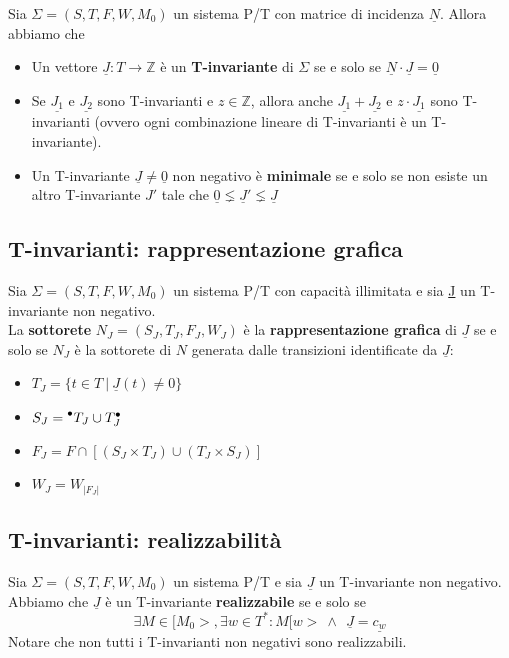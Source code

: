Sia $\Sigma = (S, T, F, W, M_0)$ un sistema P/T con matrice di incidenza $\underline N$. Allora abbiamo che
\begin{itemize}
	\item Un vettore $\underline J : T \to \mathbb Z$ è un \textbf{T-invariante} di $\Sigma$ se e solo se $\underline N \cdot \underline J = \underline 0$
	\item Se $\underline{J_1}$ e $\underline{J_2}$ sono T-invarianti e $z \in \mathbb Z$, allora anche $\underline{J_1} + \underline{J_2}$ e $z \cdot \underline {J_1}$ sono T-invarianti (ovvero ogni combinazione lineare di T-invarianti è un T-invariante).
	\item Un T-invariante $\underline J \neq \underline 0$ non negativo è \textbf{minimale} se e solo se non esiste un altro T-invariante $J'$ tale che $\underline 0 \lneq \underline J' \lneq \underline J$
\end{itemize}

\subsection{T-invarianti: rappresentazione grafica}

Sia $\Sigma = (S, T, F, W, M_0)$ un sistema P/T con capacità illimitata e sia \underline J un T-invariante non negativo.\\
La \textbf{sottorete} $N_J = (S_J, T_J, F_J, W_J)$ è la \textbf{rappresentazione grafica} di $\underline J$ se e solo se $N_J$ è la sottorete di $N$ generata dalle transizioni identificate da $\underline J$:
\begin{itemize}
	\item $T_J = \{ t \in T \ | \ \underline J(t) \neq 0 \}$
	\item $S_J = \prescript{\bullet}{}{T_J} \cup T_J^\bullet$
	\item $F_J = F \cap [(S_J \times T_J)\cup(T_J \times S_J)]$
	\item $W_J = W_{|F_J|}$
\end{itemize}

\subsection{T-invarianti: realizzabilità}

Sia $\Sigma = (S, T, F, W, M_0)$ un sistema P/T e sia $\underline J$ un T-invariante non negativo. Abbiamo che $\underline J$ è un T-invariante \textbf{realizzabile} se e solo se
\[
	\exists M \in [M_0>, \exists w \in T^* : M[w> \ \wedge \ \ \underline J = \underline{c_w}
\]
Notare che non tutti i T-invarianti non negativi sono realizzabili.


